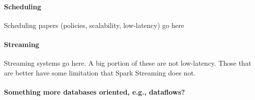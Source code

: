 
\paragraph {\bf Scheduling} Scheduling papers (policies, scalability, low-latency) go here~\cite{Sparrow}

\paragraph {\bf Streaming} Streaming systems go here. A big portion of these are not low-latency. Those that are better have some limitation that Spark Streaming does not.

\paragraph {\bf Something more databases oriented, e.g., dataflows?}
